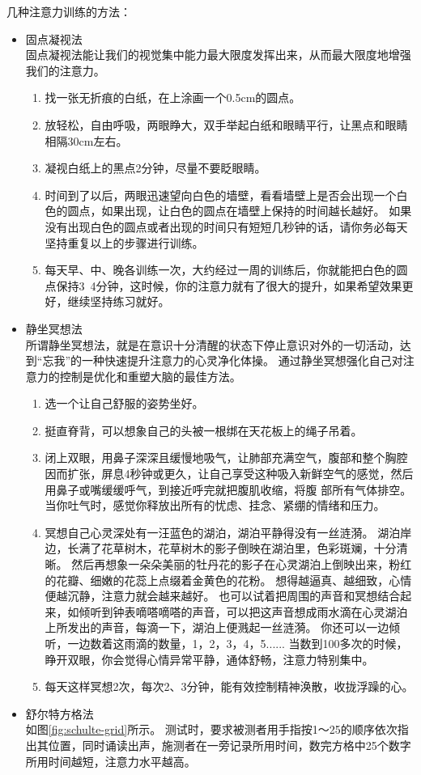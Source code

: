 几种注意力训练的方法：
\begin{itemize}
\item 固点凝视法\\
  固点凝视法能让我们的视觉集中能力最大限度发挥出来，从而最大限度地增强我们的注意力。
  \begin{enumerate}
  \item 找一张无折痕的白纸，在上涂画一个0.5cm的圆点。
  \item 放轻松，自由呼吸，两眼睁大，双手举起白纸和眼睛平行，让黑点和眼睛相隔30cm左右。
  \item 凝视白纸上的黑点2分钟，尽量不要眨眼睛。
  \item 时间到了以后，两眼迅速望向白色的墙壁，看看墙壁上是否会出现一个白色的圆点，如果出现，让白色的圆点在墙壁上保持的时间越长越好。
    如果没有出现白色的圆点或者出现的时间只有短短几秒钟的话，请你务必每天坚持重复以上的步骤进行训练。
  \item 每天早、中、晚各训练一次，大约经过一周的训练后，你就能把白色的圆点保持3~4分钟，这时候，你的注意力就有了很大的提升，如果希望效果更好，继续坚持练习就好。
  \end{enumerate}
\item 静坐冥想法\\
  所谓静坐冥想法，就是在意识十分清醒的状态下停止意识对外的一切活动，达到“忘我”的一种快速提升注意力的心灵净化体操。
  通过静坐冥想强化自己对注意力的控制是优化和重塑大脑的最佳方法。

  \begin{enumerate}
  \item 选一个让自己舒服的姿势坐好。
  \item 挺直脊背，可以想象自己的头被一根绑在天花板上的绳子吊着。
  \item 闭上双眼，用鼻子深深且缓慢地吸气，让肺部充满空气，腹部和整个胸腔因而扩张，屏息4秒钟或更久，让自己享受这种吸入新鲜空气的感觉，然后用鼻子或嘴缓缓呼气，到接近呼完就把腹肌收缩，将腹 部所有气体排空。当你吐气时，感觉你释放出所有的忧虑、挂念、紧绷的情绪和压力。
  \item 冥想自己心灵深处有一汪蓝色的湖泊，湖泊平静得没有一丝涟漪。
    湖泊岸边，长满了花草树木，花草树木的影子倒映在湖泊里，色彩斑斓，十分清晰。
    然后再想象一朵朵美丽的牡丹花的影子在心灵湖泊上倒映出来，粉红的花瓣、细嫩的花蕊上点缀着金黄色的花粉。
    想得越逼真、越细致，心情便越沉静，注意力就会越来越好。
    也可以试着把周围的声音和冥想结合起来，如倾听到钟表嘀嗒嘀嗒的声音，可以把这声音想成雨水滴在心灵湖泊上所发出的声音，每滴一下，湖泊上便溅起一丝涟漪。
    你还可以一边倾听，一边数着这雨滴的数量，1，2，3，4，5......
    当数到100多次的时候，睁开双眼，你会觉得心情异常平静，通体舒畅，注意力特别集中。
  \item 每天这样冥想2次，每次2、3分钟，能有效控制精神涣散，收拢浮躁的心。
  \end{enumerate}
\item 舒尔特方格法\\
  如图\ref{fig:schulte-grid}所示。
  测试时，要求被测者用手指按1～25的顺序依次指出其位置，同时诵读出声，施测者在一旁记录所用时间，数完方格中25个数字所用时间越短，注意力水平越高。


\end{itemize}
